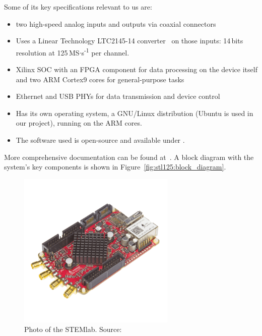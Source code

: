 Some of its key specifications relevant to us are:
\begin{itemize}\tightlist
    \item
        two high-speed analog inputs and outputs via coaxial connectors
    \item
        Uses  a  Linear Technology  LTC2145-14  converter~\cite{lt:ltc2145-14}
        on      those      inputs:      \num{14}\,bits      resolution      at
        \num{125}\,MS$\cdot$s\textsuperscript{-1} per channel.
    \item
        Xilinx SOC  with an FPGA component  for data processing on  the device
        itself and two ARM Cortex9 cores for general-purpose tasks
    \item
        Ethernet and USB PHYs for data transmission and device control
    \item
        Has its own operating system, a GNU/Linux distribution (Ubuntu is used
        in our project), running on the ARM cores.
    \item
        The software used is open-source and available under \cite{pita:github}.
\end{itemize}
More  comprehensive documentation  can be  found at~\cite{pita:readthedocs}. A
block   diagram   with    the   system's   key   components    is   shown   in
Figure~\ref{fig:stl125:block_diagram}.

\begin{figure}
    \centering
    \includegraphics[width=0.67\textwidth]{images/stl125/stemlab125-14-photo.png}
    \caption[STEMlab Photo]
        {Photo of the STEMlab. Source:~\cite{pita:elektor:starterkit}}
    \label{fig:stl125:photo}
\end{figure}

